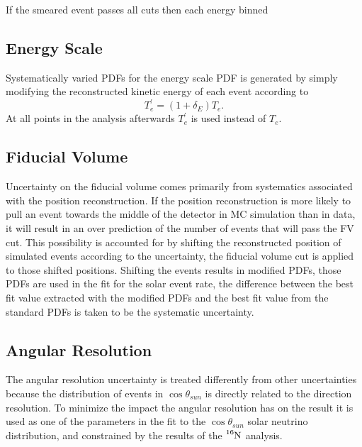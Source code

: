 If the smeared event passes all cuts then each energy binned

\subsection{Energy Scale}
Systematically varied PDFs for the energy scale PDF is generated by simply modifying the reconstructed
kinetic energy of each event according to
\begin{equation}
  T^{\prime}_{e} = (1+\delta_{E})T_{e}\text{.}
\end{equation}
At all points in the analysis afterwards $T^{\prime}_{e}$ is used instead of $T_{e}$.

\subsection{Fiducial Volume}
Uncertainty on the fiducial volume comes primarily from systematics associated
with the position reconstruction.
If the position reconstruction is more likely to pull an event towards the
middle of the detector
in MC simulation than in data, it will result in an over prediction of the
number of events that will pass the FV cut.
This possibility is accounted for by shifting the reconstructed position of
simulated events according to the uncertainty, the fiducial volume cut is
applied to those shifted positions.  Shifting the events results in modified
PDFs, those PDFs are used in the fit for the solar event rate, the difference
between the best fit value extracted with the modified PDFs and the best fit
value from the standard PDFs is taken to be the systematic uncertainty.
\subsection{Angular Resolution}
The angular resolution uncertainty is treated differently from other
uncertainties because the distribution of events in $\cos\theta_{sun}$ is
directly related to the direction resolution.  To minimize the impact the
angular resolution has on the result it is used as one of the parameters in the
fit to the $\cos\theta_{sun}$ solar neutrino distribution, and constrained by
the results of the $\ce{^{16}N}$ analysis.

